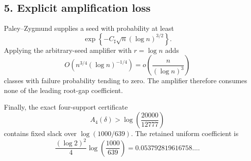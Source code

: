 \subsection*{5. Explicit amplification loss}

Paley--Zygmund supplies a seed with probability at least
\[
  \exp\!\left\{-C_\sharp\sqrt n(\log n)^{3/2}\right\}.
\]
Applying the arbitrary-seed amplifier with $r=\log n$ adds
\[
  O\!\left(n^{3/4}(\log n)^{-1/4}\right)
  =o\!\left(\frac{n}{(\log n)^3}\right)
\]
classes with failure probability tending to zero. The amplifier therefore
consumes none of the leading root-gap coefficient.

Finally, the exact four-support certificate
\[
  A_4(\delta)
  >
  \log\!\left(\frac{20000}{12777}\right)
\]
contains fixed slack over $\log(1000/639)$. The retained uniform coefficient is
\[
  \frac{(\log 2)^2}{4}
  \log\!\left(\frac{1000}{639}\right)
  =0.053792819616758\ldots.
\]
